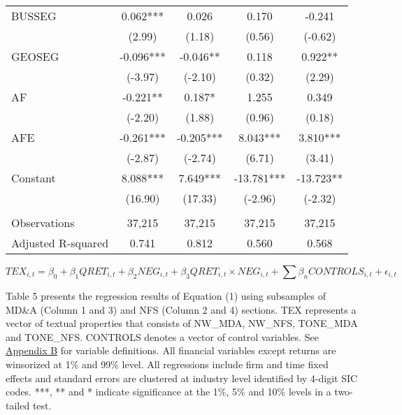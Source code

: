\begin{table}[H]
\begin{center}
\begin{tabular}{lcccc}
			BUSSEG & 0.062*** & 0.026 & 0.170 & -0.241 \\
			& (2.99) & (1.18) & (0.56) & (-0.62) \\
			GEOSEG & -0.096*** & -0.046** & 0.118 & 0.922** \\
			& (-3.97) & (-2.10) & (0.32) & (2.29) \\
			AF & -0.221** & 0.187* & 1.255 & 0.349 \\
			& (-2.20) & (1.88) & (0.96) & (0.18) \\
			AFE & -0.261*** & -0.205*** & 8.043*** & 3.810*** \\
			& (-2.87) & (-2.74) & (6.71) & (3.41) \\
			Constant & 8.088*** & 7.649*** & -13.781*** & -13.723** \\
			& (16.90) & (17.33) & (-2.96) & (-2.32) \\
			&   &   &   &  \\
			Observations & 37,215 & 37,215 & 37,215 & 37,215 \\
			Adjusted R-squared & 0.741 & 0.812 & 0.560 & 0.568 \\
			\bottomrule
			\bottomrule
		\end{tabular}%
	\end{center}
\begin{footnotesize}
	\setcounter{equation}{0}
	\begin{equation}
		TEX_{i,t}=\beta_0+\beta_1QRET_{i,t}+\beta_2NEG_{i,t}+\beta_3QRET_{i,t}\times NEG_{i,t}+\sum\beta_nCONTROLS_{i,t}+\epsilon_{i,t}
	\end{equation}
	
	\noindent Table 5 presents the regression results of Equation (1) using subsamples of MD\&A (Column 1 and 3) and NFS (Column 2 and 4) sections. TEX represents a vector of textual properties that consists of NW\_MDA, NW\_NFS, TONE\_MDA and TONE\_NFS. CONTROLS denotes a vector of control variables. See \hyperref[appb]{Appendix B} for variable definitions. All financial variables except returns are winsorized at 1\% and 99\% level. All regressions include firm and time fixed effects and standard errors are clustered at industry level identified by 4-digit SIC codes. ***, ** and * indicate significance at the 1\%, 5\% and 10\% levels in a two-tailed test.
\end{footnotesize}
\end{table}%